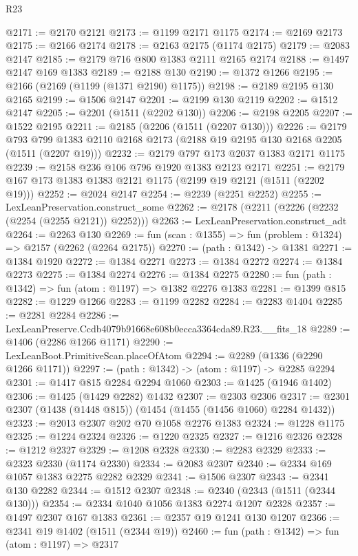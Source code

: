 \begin{lexlean}{R23}
\begin{coremodule}
@2171 := @2170 @2121
@2173 := @1199 @2171 @1175
@2174 := @2169 @2173
@2175 := @2166 @2174
@2178 := @2163 @2175 (@1174 @2175)
@2179 := @2083 @2147
@2185 := @2179 @716 @800 @1383 @2111 @2165 @2174
@2188 := @1497 @2147 @169 @1383
@2189 := @2188 @130
@2190 := @1372 @1266
@2195 := @2166 (@2169 (@1199 (@1371 @2190) @1175))
@2198 := @2189 @2195 @130 @2165
@2199 := @1506 @2147
@2201 := @2199 @130 @2119
@2202 := @1512 @2147
@2205 := @2201 (@1511 (@2202 @130))
@2206 := @2198 @2205
@2207 := @1522 @2195
@2211 := @2185 (@2206 (@1511 (@2207 @130)))
@2226 := @2179
    @793
    @799
    @1383
    @2110
    @2168
    @2173
    (@2188 @19 @2195 @130 @2168 @2205 (@1511 (@2207 @19)))
@2232 := @2179 @797 @173 @2037 @1383 @2171 @1175
@2239 := @2158 @236 @106 @796 @1920 @1383 @2123 @2171
@2251 := @2179 @167 @173 @1383 @1383 @2121 @1175 (@2199 @19 @2121 (@1511 (@2202 @19)))
@2252 := @2024 @2147
@2254 := @2239 (@2251 @2252)
@2255 := LexLeanPreservation.construct_some
@2262 := @2178 (@2211 (@2226 (@2232 (@2254 (@2255 @2121)) @2252)))
@2263 := LexLeanPreservation.construct_adt
@2264 := @2263 @130
@2269 := fun (scan : @1355) => fun (problem : @1324) => @2157 (@2262 (@2264 @2175))
@2270 := (path : @1342) -> @1381
@2271 := @1384 @1920
@2272 := @1384 @2271
@2273 := @1384 @2272
@2274 := @1384 @2273
@2275 := @1384 @2274
@2276 := @1384 @2275
@2280 := fun (path : @1342) => fun (atom : @1197) => @1382 @2276 @1383
@2281 := @1399 @815
@2282 := @1229 @1266
@2283 := @1199 @2282
@2284 := @2283 @1404
@2285 := @2281 @2284
@2286 := LexLeanPreserve.Ccdb4079b91668e608b0ecca3364cda89.R23.__fits_18
@2289 := @1406 (@2286 @1266 @1171)
@2290 := LexLeanBoot.PrimitiveScan.placeOfAtom
@2294 := @2289 (@1336 (@2290 @1266 @1171))
@2297 := (path : @1342) -> (atom : @1197) -> @2285 @2294
@2301 := @1417 @815 @2284 @2294 @1060
@2303 := @1425 (@1946 @1402)
@2306 := @1425 (@1429 @2282) @1432
@2307 := @2303 @2306
@2317 := @2301 @2307 (@1438 (@1448 @815)) (@1454 (@1455 (@1456 @1060) @2284 @1432))
@2323 := @2013 @2307 @202 @70 @1058 @2276 @1383
@2324 := @1228 @1175
@2325 := @1224 @2324
@2326 := @1220 @2325
@2327 := @1216 @2326
@2328 := @1212 @2327
@2329 := @1208 @2328
@2330 := @2283 @2329
@2333 := @2323 @2330 (@1174 @2330)
@2334 := @2083 @2307
@2340 := @2334 @169 @1057 @1383 @2275 @2282 @2329
@2341 := @1506 @2307
@2343 := @2341 @130 @2282
@2344 := @1512 @2307
@2348 := @2340 (@2343 (@1511 (@2344 @130)))
@2354 := @2334 @1040 @1056 @1383 @2274 @1207 @2328
@2357 := @1497 @2307 @167 @1383
@2361 := @2357 @19 @1241 @130 @1207
@2366 := @2341 @19 @1402 (@1511 (@2344 @19))
@2460 := fun (path : @1342) =>
  fun (atom : @1197) =>
  @2317

\end{coremodule}
\end{lexlean}

